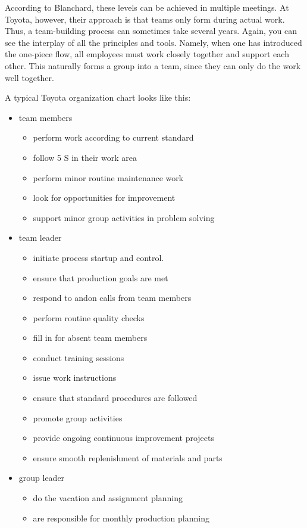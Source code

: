 \documentclass[a4paper,11pt]{article}
\begin{document}
According to Blanchard, these levels can be achieved in multiple meetings. At
Toyota, however, their approach is that teams only form during actual
work. Thus, a team-building process can sometimes take several years. Again,
you can see the interplay of all the principles and tools. Namely, when one
has introduced the one-piece flow, all employees must work closely together
and support each other. This naturally forms a group into a team, since they
can only do the work well together.

A typical Toyota organization chart looks like this:
\begin{itemize}
\item team members
  \begin{itemize}
  \item perform work according to current standard
  \item follow 5 S in their work area
  \item perform minor routine maintenance work
  \item look for opportunities for improvement
  \item support minor group activities in problem solving
  \end{itemize}
\item team leader
  \begin{itemize}
  \item initiate process startup and control.
  \item ensure that production goals are met
  \item respond to andon calls from team members
  \item perform routine quality checks
  \item fill in for absent team members
  \item conduct training sessions
  \item issue work instructions
  \item ensure that standard procedures are followed
  \item promote group activities
  \item provide ongoing continuous improvement projects
  \item ensure smooth replenishment of materials and parts
  \end{itemize}
\item group leader
  \begin{itemize}
  \item do the vacation and assignment planning
  \item are responsible for monthly production planning

\end{itemize}
\end{itemize}
\end{document}
